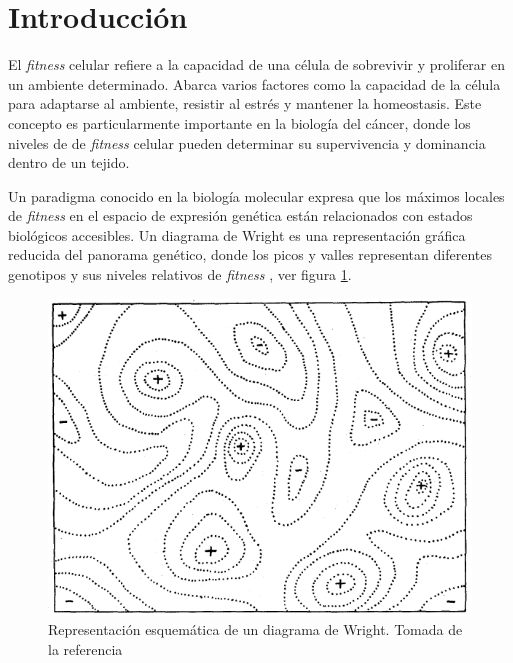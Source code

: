 \chapter*{Introducción} \label{intro}
\onehalfspacing

El \textit{fitness} celular refiere a la capacidad de una célula de sobrevivir y proliferar en un ambiente determinado. Abarca varios factores como la capacidad de la célula para adaptarse al ambiente, resistir al estrés y mantener la homeostasis. Este concepto es particularmente importante en la biología del cáncer, donde los niveles de de \textit{fitness} celular pueden determinar su supervivencia y dominancia dentro de un tejido.

Un paradigma conocido en la biología molecular expresa que los máximos locales de \textit{fitness} en el espacio de expresión genética están relacionados con estados biológicos accesibles. Un diagrama de Wright es una representación gráfica reducida del panorama genético, donde los picos y valles representan diferentes genotipos y sus niveles relativos de \textit{fitness} \cite{wright1932roles}, ver figura \ref{fig:wrightDiagram}. 

\begin{figure}[ht]
	\centering
	\includegraphics[scale=0.5]{figures/wright_diagram.png}
	\caption{Representación esquemática de un diagrama de Wright. Tomada de la referencia \cite{wright1932roles}}
	\label{fig:wrightDiagram}
\end{figure}

